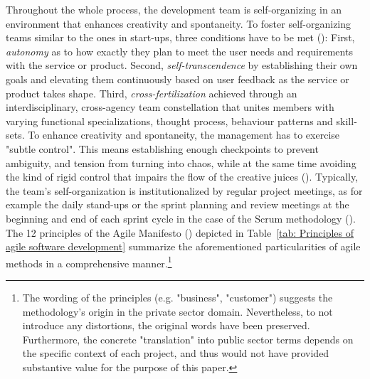 Throughout the whole process, the development team is self-organizing in an environment that enhances creativity and spontaneity. To foster self-organizing teams similar to the ones in start-ups, three conditions have to be met (\cite{TakeuchiI1986}): First, \textit{autonomy} as to how exactly they plan to meet the user needs and requirements with the service or product. Second, \textit{self-transcendence} by establishing their own goals and elevating them continuously based on user feedback as the service or product takes shape. Third, \textit{cross-fertilization} achieved through an interdisciplinary, cross-agency team constellation that unites members with varying functional specializations, thought process, behaviour patterns and skill-sets. To enhance creativity and spontaneity, the management has to exercise "subtle control". This means establishing enough checkpoints to prevent ambiguity, and tension from turning into chaos, while at the same time avoiding the kind of rigid control that impairs the flow of the creative juices (\cite{TakeuchiI1986}). Typically, the team's self-organization is institutionalized by regular project meetings, as for example the daily stand-ups or the sprint planning and review meetings at the beginning and end of each sprint cycle in the case of the Scrum methodology (\cite{Scrum.org2019}). The 12 principles of the Agile Manifesto (\cite*{AgileManifesto2001}) depicted in Table~\ref{tab: Principles of agile software development} summarize the aforementioned particularities of agile methods in a comprehensive manner.\footnote{The wording of the principles (e.g. "business", "customer") suggests the methodology's origin in the private sector domain. Nevertheless, to not introduce any distortions, the original words have been preserved. Furthermore, the concrete "translation" into public sector terms depends on the specific context of each project, and thus would not have provided substantive value for the purpose of this paper.}

